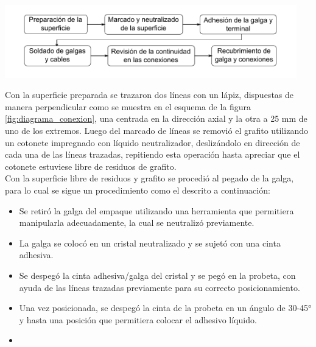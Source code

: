 \begin{center}
\includegraphics[width=0.95\textwidth]{src/ch3/metodologia_instrumentacion.pdf}
\label{fig:metodologia_instrumentacion}
\end{center}

Con la superficie preparada se trazaron dos líneas con un lápiz, dispuestas de manera perpendicular 
como se muestra en el esquema de la figura \ref{fig:diagrama_conexion}, una centrada en 
la dirección axial y la otra a 25 mm de uno de los extremos. Luego del marcado de líneas 
se removió el grafito utilizando un cotonete impregnado con líquido neutralizador, deslizándolo en 
dirección de cada una de las líneas trazadas, repitiendo esta operación hasta apreciar que 
el cotonete estuviese libre de residuos de grafito. \\



Con la superficie libre de residuos y grafito se procedió al pegado de la galga, para lo cual se sigue 
un procedimiento como el descrito a continuación: 

\begin{itemize}
\item Se retiró la galga del empaque utilizando una herramienta que permitiera manipularla adecuadamente, 
la cual se neutralizó previamente. 
\item La galga se colocó en un cristal neutralizado y se sujetó con una cinta adhesiva.
\item Se despegó la cinta adhesiva/galga del cristal y se pegó en la probeta, con ayuda de las 
líneas trazadas previamente para su correcto posicionamiento.
\item Una vez posicionada, se despegó la cinta de la probeta en un ángulo de 30-45° y hasta una posición 
que permitiera colocar el adhesivo líquido.
\item 
\end{itemize}


